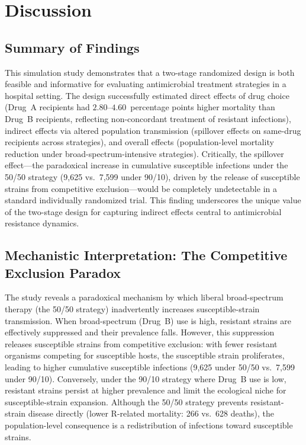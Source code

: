 \documentclass[preprint,11pt]{elsarticle}
\begin{document}
\section{Discussion}

\subsection{Summary of Findings}

This simulation study demonstrates that a two-stage randomized design is both feasible and informative for evaluating antimicrobial treatment strategies in a hospital setting. The design successfully estimated direct effects of drug choice (Drug~A recipients had $2.80$--$4.60$~percentage points higher mortality than Drug~B recipients, reflecting non-concordant treatment of resistant infections), indirect effects via altered population transmission (spillover effects on same-drug recipients across strategies), and overall effects (population-level mortality reduction under broad-spectrum-intensive strategies). Critically, the spillover effect---the paradoxical increase in cumulative susceptible infections under the 50/50 strategy (9,625 vs.\ 7,599 under 90/10), driven by the release of susceptible strains from competitive exclusion---would be completely undetectable in a standard individually randomized trial. This finding underscores the unique value of the two-stage design for capturing indirect effects central to antimicrobial resistance dynamics.

\subsection{Mechanistic Interpretation: The Competitive Exclusion Paradox}

The study reveals a paradoxical mechanism by which liberal broad-spectrum therapy (the 50/50 strategy) inadvertently increases susceptible-strain transmission. When broad-spectrum (Drug~B) use is high, resistant strains are effectively suppressed and their prevalence falls. However, this suppression releases susceptible strains from competitive exclusion: with fewer resistant organisms competing for susceptible hosts, the susceptible strain proliferates, leading to higher cumulative susceptible infections (9,625 under 50/50 vs.\ 7,599 under 90/10). Conversely, under the 90/10 strategy where Drug~B use is low, resistant strains persist at higher prevalence and limit the ecological niche for susceptible-strain expansion. Although the 50/50 strategy prevents resistant-strain disease directly (lower R-related mortality: 266 vs.\ 628 deaths), the population-level consequence is a redistribution of infections toward susceptible strains.
\end{document}
